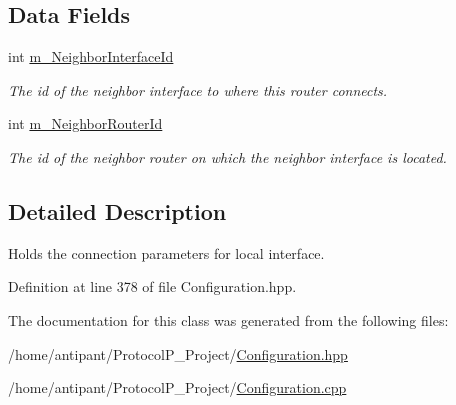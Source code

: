 \subsection*{Data Fields}
\begin{DoxyCompactItemize}
\item 
\hypertarget{classConnection_aa025764cb3ec8317eebf40b4c92f0551}{int \hyperlink{classConnection_aa025764cb3ec8317eebf40b4c92f0551}{m\-\_\-\-Neighbor\-Interface\-Id}}\label{classConnection_aa025764cb3ec8317eebf40b4c92f0551}

\begin{DoxyCompactList}\small\item\em The id of the neighbor interface to where this router connects. \end{DoxyCompactList}\item 
\hypertarget{classConnection_a0c3cc5f16fa26d798d63472a309185cb}{int \hyperlink{classConnection_a0c3cc5f16fa26d798d63472a309185cb}{m\-\_\-\-Neighbor\-Router\-Id}}\label{classConnection_a0c3cc5f16fa26d798d63472a309185cb}

\begin{DoxyCompactList}\small\item\em The id of the neighbor router on which the neighbor interface is located. \end{DoxyCompactList}\end{DoxyCompactItemize}


\subsection{Detailed Description}
Holds the connection parameters for local interface. 

Definition at line 378 of file Configuration.\-hpp.



The documentation for this class was generated from the following files\-:\begin{DoxyCompactItemize}
\item 
/home/antipant/\-Protocol\-P\-\_\-\-Project/\hyperlink{Configuration_8hpp}{Configuration.\-hpp}\item 
/home/antipant/\-Protocol\-P\-\_\-\-Project/\hyperlink{Configuration_8cpp}{Configuration.\-cpp}\end{DoxyCompactItemize}
